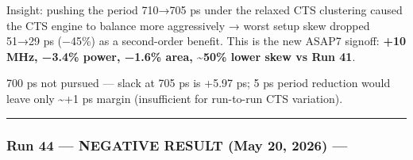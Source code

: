 \begin{record}
Insight: pushing the period 710→705 ps under the relaxed CTS clustering
caused the CTS engine to balance more aggressively → worst setup skew
dropped 51→29 ps (−45\%) as a second-order benefit. This is the new
ASAP7 signoff: \textbf{+10 MHz, −3.4\% power, −1.6\% area,
\textasciitilde50\% lower skew vs Run 41}.

700 ps not pursued --- slack at 705 ps is +5.97 ps; 5 ps period
reduction would leave only \textasciitilde+1 ps margin (insufficient for
run-to-run CTS variation).

\begin{center}\rule{0.5\linewidth}{0.5pt}\end{center}

\end{record}

\subsubsection{\texorpdfstring{Run 44 --- NEGATIVE RESULT (May 20, 2026)
---
}{Run 44 --- NEGATIVE RESULT (May 20, 2026) --- }}\label{cr:run:asap7-cpu:run-44-negative-result-may-20-2026-run-2026-05-20-21-43-24}

